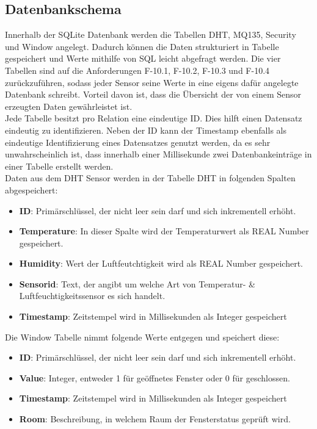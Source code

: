 \subsection{Datenbankschema}
Innerhalb der SQLite Datenbank werden die Tabellen DHT, MQ135, Security und Window angelegt. Dadurch können die Daten strukturiert in Tabelle gespeichert und Werte mithilfe von SQL leicht abgefragt werden. Die vier Tabellen sind auf die Anforderungen F-10.1, F-10.2, F-10.3 und F-10.4 zurückzuführen, sodass jeder Sensor seine Werte in eine eigens dafür angelegte Datenbank schreibt. Vorteil davon ist, dass die Übersicht der von einem Sensor erzeugten Daten gewährleistet ist.\\
Jede Tabelle besitzt pro Relation eine eindeutige ID. Dies hilft einen Datensatz eindeutig zu identifizieren. Neben der ID kann der Timestamp ebenfalls als eindeutige Identifizierung eines Datensatzes genutzt werden, da es sehr unwahrscheinlich ist, dass innerhalb einer Millisekunde zwei Datenbankeinträge in einer Tabelle erstellt werden.\\

Daten aus dem DHT Sensor werden in der Tabelle DHT in folgenden Spalten abgespeichert:
\begin{itemize}
	\item \textbf{ID}: Primärschlüssel, der nicht leer sein darf und sich inkrementell erhöht.  
	\item \textbf{Temperature}: In dieser Spalte wird der Temperaturwert als REAL Number gespeichert.
	\item \textbf{Humidity}: Wert der Luftfeutchtigkeit wird als REAL Number gespeichert.
	\item \textbf{Sensorid}: Text, der angibt um welche Art von Temperatur- \& Luftfeuchtigkeitssensor es sich handelt.
	\item \textbf{Timestamp}: Zeitstempel wird in Millisekunden als Integer gespeichert
\end{itemize}

Die Window Tabelle nimmt folgende Werte entgegen und speichert diese:
\begin{itemize}
	\item \textbf{ID}: Primärschlüssel, der nicht leer sein darf und sich inkrementell erhöht.  
	\item \textbf{Value}: Integer, entweder 1 für geöffnetes Fenster oder 0 für geschlossen.
	\item \textbf{Timestamp}: Zeitstempel wird in Millisekunden als Integer gespeichert
	\item \textbf{Room}: Beschreibung, in welchem Raum der Fensterstatus geprüft wird. 
\end{itemize}

